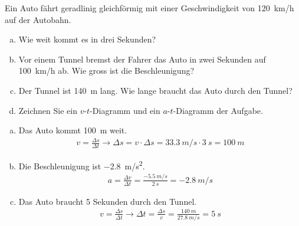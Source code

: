 
\begin{aufgabe}
	Ein Auto fährt geradlinig gleichförmig mit einer Geschwindigkeit von \SI{120}{km/h} auf der Autobahn.  
\begin{enumerate}[a)]
	\item Wie weit kommt es in drei Sekunden?
	\item Vor einem Tunnel bremst der Fahrer das Auto in zwei Sekunden auf \SI{100}{km/h} ab.
		Wie gross ist die Beschleunigung?
	\item Der Tunnel ist \SI{140}{m} lang. Wie lange braucht das Auto durch den Tunnel?
	\item Zeichnen Sie ein $v$-$t$-Diagramm und ein $a$-$t$-Diagramm der Aufgabe.
\end{enumerate}


\begin{loesung}
	\begin{enumerate} [a)]
		\item Das Auto kommt \SI{100}{m} weit.
	\begin{eqnarray*}
		v=\frac{\Delta s}{\Delta t} \to \Delta s =v\cdot\Delta s = \SI{33.3}{m/s}\cdot\SI{3}{s}=\SI{100}{m}
	\end{eqnarray*}
\item Die Beschleunigung ist \SI{-2.8}{m/s^2}.
	\begin{eqnarray*}
		a=\frac{\Delta v}{\Delta t} =\frac{\SI{-5.5}{m/s}}{\SI{2}{s}}=\SI{-2.8}{m/s} 
	\end{eqnarray*}
\item Das Auto braucht 5 Sekunden durch den Tunnel.
	\begin{eqnarray*}
		v=\frac{\Delta s}{\Delta t} \to \Delta t =\frac{\Delta s}{v} =\frac{\SI{140}{m}}{\SI{27.8}{m/s}} = \SI{5}{s}
	\end{eqnarray*}
	\end{enumerate}
\end{loesung}

\end{aufgabe}

